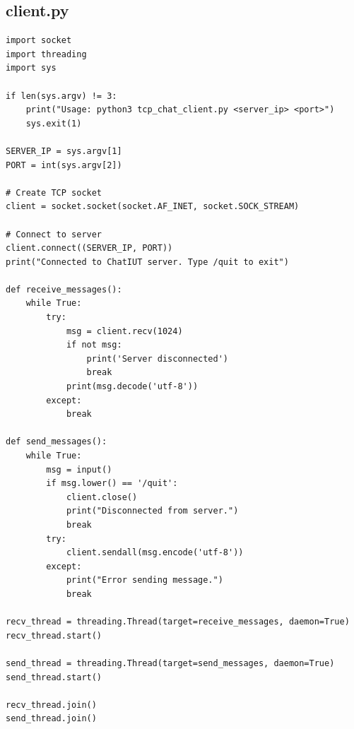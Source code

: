 \documentclass[11pt,a4paper]{article}
\begin{document}
\subsection*{client.py}
\begin{lstlisting}[style=labcode]
import socket
import threading
import sys

if len(sys.argv) != 3:
    print("Usage: python3 tcp_chat_client.py <server_ip> <port>")
    sys.exit(1)

SERVER_IP = sys.argv[1]
PORT = int(sys.argv[2])

# Create TCP socket
client = socket.socket(socket.AF_INET, socket.SOCK_STREAM)

# Connect to server
client.connect((SERVER_IP, PORT))
print("Connected to ChatIUT server. Type /quit to exit")

def receive_messages():
    while True:
        try:
            msg = client.recv(1024)
            if not msg:
                print('Server disconnected')
                break
            print(msg.decode('utf-8'))
        except:
            break

def send_messages():
    while True:
        msg = input()
        if msg.lower() == '/quit':
            client.close()
            print("Disconnected from server.")
            break
        try:
            client.sendall(msg.encode('utf-8'))
        except:
            print("Error sending message.")
            break

recv_thread = threading.Thread(target=receive_messages, daemon=True)
recv_thread.start()

send_thread = threading.Thread(target=send_messages, daemon=True)
send_thread.start()

recv_thread.join()
send_thread.join()
\end{lstlisting}
\end{document}
